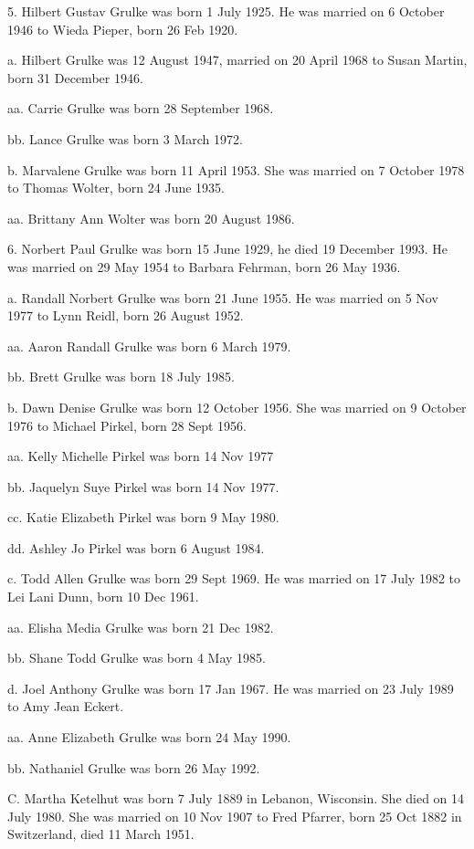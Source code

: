 \documentclass[a4paper]{article}
\begin{document}
5. Hilbert Gustav Grulke was born 1 July 1925.  He was married on 6 October 1946 to Wieda Pieper, born 26 Feb 1920.  

a. Hilbert Grulke was 12 August 1947, married on 20 April 1968 to Susan Martin, born 31 December 1946.

aa. Carrie Grulke was born 28 September 1968.

bb. Lance Grulke was born 3 March 1972.

b. Marvalene Grulke was born 11 April 1953.  She was married on 7 October 1978 to Thomas Wolter, born 24 June 1935.  

aa. Brittany Ann Wolter was born 20 August 1986.

6. Norbert Paul Grulke was born 15 June 1929, he died 19 December 1993. He was married on 29 May 1954 to Barbara Fehrman, born 26 May 1936.

a. Randall Norbert Grulke was born 21 June 1955.  He was married on 5 Nov 1977 to Lynn Reidl, born 26 August 1952. 

aa. Aaron Randall Grulke was born 6 March 1979.

bb. Brett Grulke was born 18 July 1985.

b. Dawn Denise Grulke was born 12 October 1956.  She was married on 9 October 1976 to Michael Pirkel, born 28 Sept 1956.

aa. Kelly Michelle Pirkel was born 14 Nov 1977

bb. Jaquelyn Suye Pirkel was born 14 Nov 1977.
				
cc.  Katie Elizabeth Pirkel was born 9 May 1980.

dd. Ashley Jo Pirkel was born 6 August 1984.

c. Todd Allen Grulke was born 29 Sept 1969.  He was married on 17 July 1982 to Lei Lani Dunn, born 10 Dec 1961.

aa. Elisha Media Grulke was born 21 Dec 1982.

bb. Shane Todd Grulke was born 4 May 1985.

d. Joel Anthony Grulke was born 17 Jan 1967.  He was married on 23 July 1989 to Amy Jean Eckert.

aa. Anne Elizabeth Grulke was born 24 May 1990.

bb. Nathaniel Grulke was born 26 May 1992.

C. Martha Ketelhut was born 7 July 1889 in Lebanon, Wisconsin.  She died on 14 July 1980.  She was married on 10 Nov 1907 to Fred Pfarrer, born 25 Oct 1882 in Switzerland, died 11 March 1951. 
\end{document}
